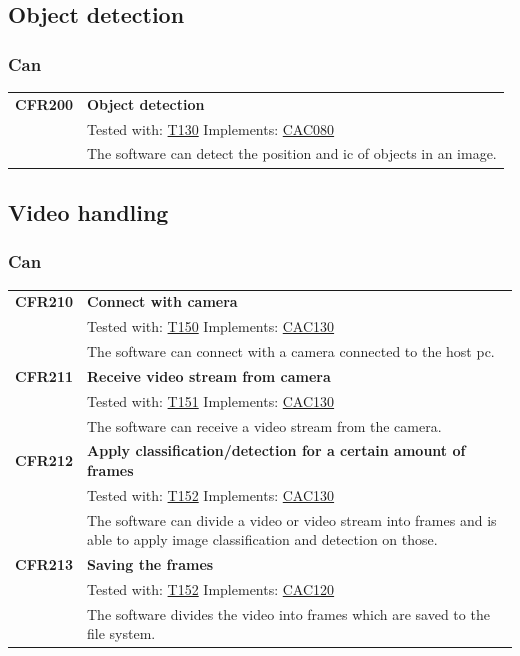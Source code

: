 \documentclass[parskip=full]{scrartcl}
\begin{document}
\subsection{Object detection}
\subsubsection{Can}
\begin{tabular}{p{2cm}p{11.4cm}}
\textbf {CFR200} \hypertarget{CFR200} & \textbf{Object detection} \\
& Tested with: \hyperlink{T130}{T130} Implements: \hyperlink{CAC080}{CAC080} \\
& The software can detect the position and \gls{ic} of objects in an image.\\
\end{tabular}

\subsection{Video handling}
\subsubsection{Can}
\begin{tabular}{p{2cm}p{11.4cm}}
\textbf{CFR210} \hypertarget{CFR210} & \textbf{Connect with camera}\\
& Tested with: \hyperlink{T150}{T150} Implements: \hyperlink{CAC130}{CAC130} \\
& The software can connect with a camera connected to the \gls{host pc}.\\
\textbf{CFR211} \hypertarget{CFR211} & \textbf{Receive video stream from camera}\\
& Tested with: \hyperlink{T151}{T151} Implements: \hyperlink{CAC130}{CAC130}\\
& The software can receive a video stream from the camera.\\
\textbf{CFR212} \hypertarget{CFR212} & \textbf{Apply classification/detection for a certain amount of frames}\\
& Tested with: \hyperlink{T152}{T152} Implements: \hyperlink{CAC130}{CAC130}\\
& The software can divide a video or video stream into frames and is able to apply \gls{image classification} and detection on those.\\
\textbf{CFR213} \hypertarget{CFR213} & \textbf{Saving the frames}\\
& Tested with: \hyperlink{T152}{T152} Implements: \hyperlink{CAC120}{CAC120}\\
& The software divides the video into frames which are saved to the file system.
\end{tabular}
\end{document}
